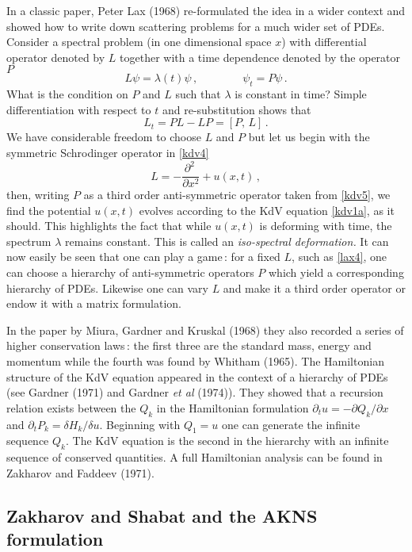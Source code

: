 \documentclass[11pt]{article}
\newcommand{\bel}{\begin{equation}\label}
\newcommand{\ee}{\end{equation}}
\begin{document}
In a classic paper, Peter Lax (1968) re-formulated the idea in a wider context and showed how to write down scattering 
problems for a much wider set of PDEs. Consider a spectral problem (in one dimensional space $x$) with differential 
operator denoted by $L$ together with a time dependence denoted by the operator $P$ 
\bel{lax1}
L\psi = \lambda(t) \psi\,,\qquad\qquad \psi_{t} = P\psi\,.
\ee
What is the condition on $P$ and $L$ such that $\lambda$ is constant in time? 
Simple differentiation with respect to $t$ and re-substitution shows that 
\bel{lax3}
L_{t} = PL - LP = [P,\,L]\,.
\ee
We have considerable freedom to choose $L$ and $P$ but let us begin with the symmetric Schrodinger operator in \eqref{kdv4}
\bel{lax4}
L = - \frac{\partial^{2}~}{\partial x^2} + u(x,t)\,,
\ee
then, writing $P$ as a third order anti-symmetric operator taken from \eqref{kdv5}, we find the potential $u(x,t)$ 
evolves according to the KdV equation \eqref{kdv1a}, as it should. This highlights the fact that while $u(x,t)$ is 
deforming with time, the spectrum $\lambda$ remains constant. This is called an \textit{iso-spectral deformation.}  
It can now easily be seen that one can play a game\,: for a fixed $L$, such as \eqref{lax4}, one can choose a hierarchy 
of anti-symmetric operators $P$ which yield a corresponding hierarchy of PDEs. Likewise one can vary $L$ and make it 
a third order operator or endow it with a matrix formulation. 
\par\smallskip%
In the paper by Miura, Gardner and Kruskal (1968) they also recorded a series of higher conservation laws\,: the first 
three are the standard mass, energy and momentum while the fourth was found by Whitham (1965). The Hamiltonian structure 
of the KdV equation appeared in the context of a hierarchy of PDEs (see Gardner (1971) and Gardner \textit{et al} (1974)). 
They showed that a recursion relation exists between the $Q_{k}$ in the Hamiltonian formulation $\partial_{t}u = - 
\partial Q_{k}/\partial x$ and $\partial_{t} P_{k} = \delta H_{k}/\delta u$. Beginning with $Q_1 = u$ one can generate 
the infinite sequence $Q_{k}$. The KdV equation is the second in the hierarchy with an infinite sequence of conserved quantities. A full Hamiltonian analysis can be found in Zakharov and Faddeev (1971). 

\subsection{\small Zakharov and Shabat and the AKNS formulation}\label{subsect:AKNS}
\end{document}

